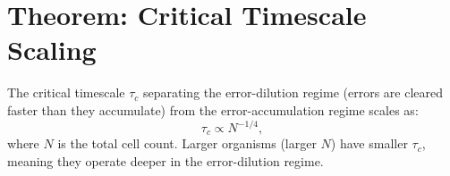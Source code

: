 \section{Theorem: Critical Timescale Scaling}
\label{sec:critical_timescale}

\begin{theorem}
\label{thm:critical_timescale}
The critical timescale $\tau_c$ separating the error-dilution regime (errors
are cleared faster than they accumulate) from the error-accumulation regime
scales as:
\begin{equation}
  \tau_c \propto N^{-1/4},
  \label{eq:tau_c_scaling}
\end{equation}
where $N$ is the total cell count. Larger organisms (larger $N$) have smaller
$\tau_c$, meaning they operate deeper in the error-dilution regime.
\end{theorem}

